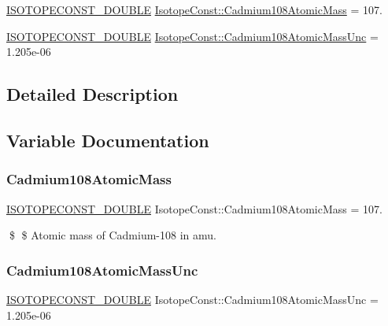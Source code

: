 \begin{DoxyCompactItemize}
\item 
\mbox{\hyperlink{group___isotope_const-_macros_ga8f45a7272ce02c0b4c65c44636ed719a}{I\+S\+O\+T\+O\+P\+E\+C\+O\+N\+S\+T\+\_\+\+D\+O\+U\+B\+LE}} \mbox{\hyperlink{group___isotope_const-_cadmium-_cd108_gacd0eb16c1cbe81638faf72b3ce78f0b9}{Isotope\+Const\+::\+Cadmium108\+Atomic\+Mass}} = 107.
\item 
\mbox{\hyperlink{group___isotope_const-_macros_ga8f45a7272ce02c0b4c65c44636ed719a}{I\+S\+O\+T\+O\+P\+E\+C\+O\+N\+S\+T\+\_\+\+D\+O\+U\+B\+LE}} \mbox{\hyperlink{group___isotope_const-_cadmium-_cd108_gae677e0bcb5fd37ed1274e3365618bc42}{Isotope\+Const\+::\+Cadmium108\+Atomic\+Mass\+Unc}} = 1.\+205e-\/06
\end{DoxyCompactItemize}


\subsection{Detailed Description}


\subsection{Variable Documentation}
\mbox{\label{group___isotope_const-_cadmium-_cd108_gacd0eb16c1cbe81638faf72b3ce78f0b9}} 
\subsubsection{\texorpdfstring{Cadmium108\+Atomic\+Mass}{Cadmium108AtomicMass}}
{\footnotesize\ttfamily \mbox{\hyperlink{group___isotope_const-_macros_ga8f45a7272ce02c0b4c65c44636ed719a}{I\+S\+O\+T\+O\+P\+E\+C\+O\+N\+S\+T\+\_\+\+D\+O\+U\+B\+LE}} Isotope\+Const\+::\+Cadmium108\+Atomic\+Mass = 107.}

\$ \$ Atomic mass of Cadmium-\/108 in amu. \mbox{\label{group___isotope_const-_cadmium-_cd108_gae677e0bcb5fd37ed1274e3365618bc42}} 
\subsubsection{\texorpdfstring{Cadmium108\+Atomic\+Mass\+Unc}{Cadmium108AtomicMassUnc}}
{\footnotesize\ttfamily \mbox{\hyperlink{group___isotope_const-_macros_ga8f45a7272ce02c0b4c65c44636ed719a}{I\+S\+O\+T\+O\+P\+E\+C\+O\+N\+S\+T\+\_\+\+D\+O\+U\+B\+LE}} Isotope\+Const\+::\+Cadmium108\+Atomic\+Mass\+Unc = 1.\+205e-\/06}


